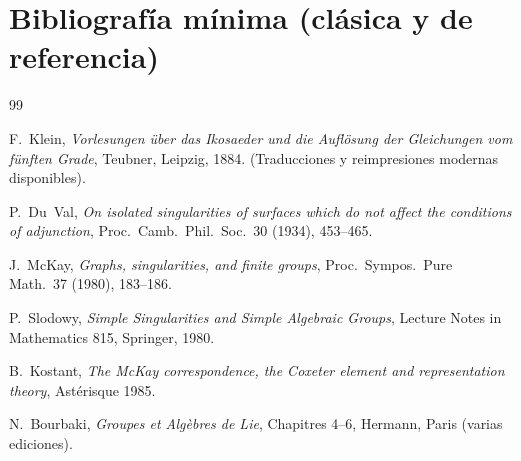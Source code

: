 \documentclass[11pt,a4paper]{article}
\theoremstyle{definition}
\theoremstyle{remark}
\begin{document}
\section*{Bibliografía mínima (clásica y de referencia)}
\begin{thebibliography}{99}

F.~Klein,
\emph{Vorlesungen über das Ikosaeder und die Auflösung der Gleichungen vom fünften Grade},
Teubner, Leipzig, 1884.
(Traducciones y reimpresiones modernas disponibles).

P.~Du~Val,
\emph{On isolated singularities of surfaces which do not affect the conditions of adjunction},
Proc.\ Camb.\ Phil.\ Soc.\ 30 (1934), 453--465.

J.~McKay,
\emph{Graphs, singularities, and finite groups},
Proc.\ Sympos.\ Pure Math.\ 37 (1980), 183--186.

P.~Slodowy,
\emph{Simple Singularities and Simple Algebraic Groups},
Lecture Notes in Mathematics 815, Springer, 1980.

B.~Kostant,
\emph{The McKay correspondence, the Coxeter element and representation theory},
Astérisque 1985.

N.~Bourbaki,
\emph{Groupes et Algèbres de Lie}, Chapitres 4--6,
Hermann, Paris (varias ediciones).

\end{thebibliography}
\end{document}
